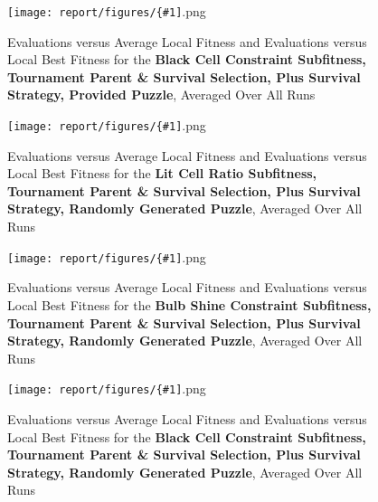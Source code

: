 \documentclass[11pt]{article}
\newcommand{\fitnessplotcaption}[1]{\caption{Evaluations versus Average Local Fitness and Evaluations versus 
    Local Best Fitness for the \textbf{{#1}}, Averaged Over All Runs}}
\newcommand{\addgraphic}[1]{\centerline{\texttt{[image: report/figures/\{\#1]}.png}}}
\begin{document}
\begin{figure}
    \addgraphic{website_puzzle__tournament_parent__tournament_survival__plus__black_cell_constr__graph}
    \fitnessplotcaption{Black Cell Constraint Subfitness, Tournament Parent \& Survival Selection,
    Plus Survival Strategy, Provided Puzzle}
    \label{fig:tourny_web3}
\end{figure}

\begin{figure}
    \addgraphic{random_gen__tournament_parent__tournament_survival__plus__lit_cell_ratio__graph}
    \fitnessplotcaption{Lit Cell Ratio Subfitness, Tournament Parent \& Survival Selection, Plus
    Survival Strategy, Randomly Generated Puzzle}
    \label{fig:tourny_rand1}
\end{figure}

\begin{figure}
    \addgraphic{random_gen__tournament_parent__tournament_survival__plus__bulb_shine_constr__graph}
    \fitnessplotcaption{Bulb Shine Constraint Subfitness, Tournament Parent \& Survival Selection,
    Plus Survival Strategy, Randomly Generated Puzzle}
    \label{fig:tourny_rand2}
\end{figure}

\begin{figure}
    \addgraphic{random_gen__tournament_parent__tournament_survival__plus__black_cell_constr__graph}
    \fitnessplotcaption{Black Cell Constraint Subfitness, Tournament Parent \& Survival Selection,
    Plus Survival Strategy, Randomly Generated Puzzle}
    \label{fig:tourny_rand3}
\end{figure}


\end{document}
